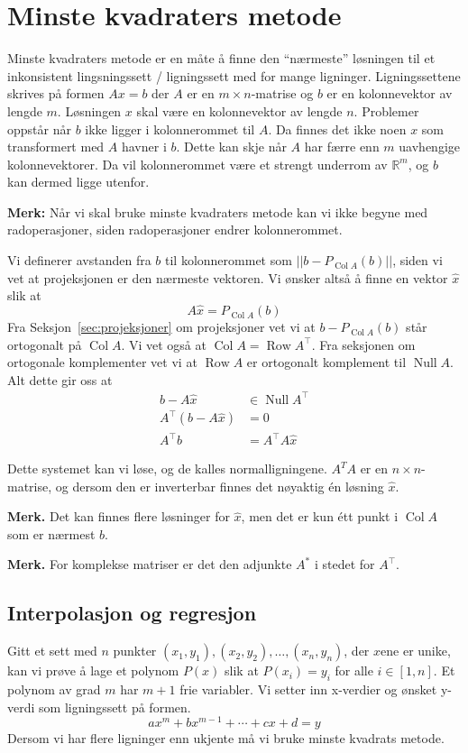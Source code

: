 \documentclass[12pt,a4paper,norsk]{article}
\newcommand{\R}{\mathbb{R}}
\DeclareMathOperator{\Col}{Col} %
\DeclareMathOperator{\Row}{Row}
\DeclareMathOperator{\Null}{Null}
\begin{document}
\section{Minste kvadraters metode}\label{sec:minste_kvadraters_metode}
Minste kvadraters metode er en måte å finne den ``nærmeste'' løsningen til et
inkonsistent lingsningssett / ligningssett med for mange ligninger.
Ligningssettene skrives på formen $Ax = b$ der $A$ er en $m \times n$-matrise og $b$
er en kolonnevektor av lengde $m$. Løsningen $x$ skal være en kolonnevektor av
lengde $n$. Problemer oppstår når $b$ ikke ligger i kolonnerommet til $A$. Da
finnes det ikke noen $x$ som transformert med $A$ havner i $b$. Dette kan skje når
$A$ har færre enn $m$ uavhengige kolonnevektorer. Da vil kolonnerommet være et strengt
underrom av $\R^{m}$, og $b$ kan dermed ligge utenfor.

\textbf{Merk:} Når vi skal bruke minste kvadraters metode kan vi ikke begyne med
radoperasjoner, siden radoperasjoner endrer kolonnerommet.

Vi definerer avstanden fra $b$ til kolonnerommet som $||b-P_{\Col A}(b)||$,
siden vi vet at projeksjonen er den nærmeste vektoren. Vi ønsker altså å finne
en vektor $\hat{x}$ slik at
\[A\hat{x} = P_{\Col A}(b)\]
Fra Seksjon~\ref{sec:projeksjoner} om projeksjoner vet vi at $b-P_{\Col A}(b)$ står
ortogonalt på $\Col A$. Vi vet også at $\Col A = \Row A^{\top}$. Fra seksjonen om
ortogonale komplementer vet vi at $\Row A$ er ortogonalt komplement til $\Null
A$. Alt dette gir oss at
\begin{align*}
  b-A\hat{x} &\in \Null A^{\top} \\
  A^{\top}(b-A\hat{x}) &= 0 \\
  A^{\top}b &= A^{\top}A\hat{x}
\end{align*}

Dette systemet kan vi løse, og de kalles normalligningene. $A^{T}A$ er en $n\times
n$-matrise, og dersom den er inverterbar finnes det nøyaktig én løsning
$\hat{x}$.

\textbf{Merk.} Det kan finnes flere løsninger for $\hat{x}$, men det er kun étt
punkt i $\Col A$ som er nærmest $b$.

\textbf{Merk.} For komplekse matriser er det den adjunkte $A^{*}$ i stedet for $A^{\top}$.

\subsection{Interpolasjon og regresjon}
Gitt et sett med $n$ punkter
$(x_{1}, y_{1}), (x_{2}, y_{2}), \ldots, (x_{n}, y_{n})$, der $x$ene er unike, kan
vi prøve å lage et polynom $P(x)$ slik at $P(x_{i}) = y_{i}$ for alle $i \in [1,n]$.
Et polynom av grad $m$ har $m+1$ frie variabler. Vi setter inn x-verdier og
ønsket y-verdi som ligningssett på formen.
\[ax^{m} + bx^{m-1} + \cdots + cx + d = y\]
Dersom vi har flere ligninger enn ukjente må vi bruke minste kvadrats metode.
\end{document}
